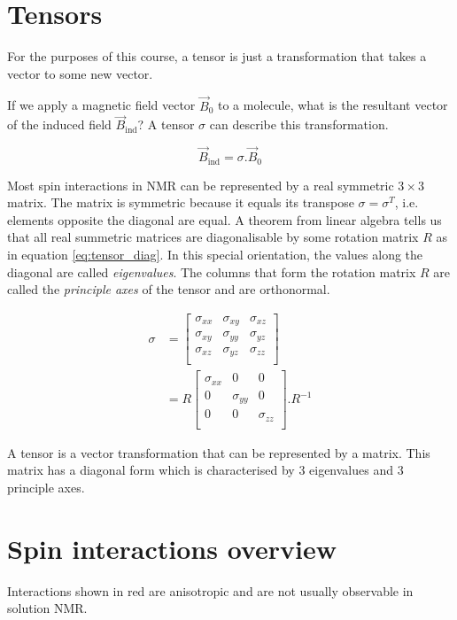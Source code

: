\documentclass[11pt]{article}
\theoremstyle{definition}
\begin{document}
\section{Tensors}
For the purposes of this course, a tensor is just a transformation that takes a vector to some new vector. 

If we apply a magnetic field vector $\vec B_0$ to a molecule, what is the resultant vector of the induced field $\vec B_\text{ind}$? A tensor $\sigma$ can describe this transformation.

\begin{equation}
	\vec B_\text{ind} = \sigma . \vec B_0
\end{equation}

Most spin interactions in NMR can be represented by a real symmetric $3\times 3$ matrix. The matrix is symmetric because it equals its transpose $\sigma=\sigma^T$, i.e. elements opposite the diagonal are equal. A theorem from linear algebra tells us that all real summetric matrices are diagonalisable by some rotation matrix $R$ as in equation \ref{eq:tensor_diag}. In this special orientation, the values along the diagonal are called \emph{eigenvalues}. The columns that form the rotation matrix $R$ are called the \emph{principle axes} of the tensor and are orthonormal. 

\begin{align}
	\sigma&=
	\begin{bmatrix}
		\sigma_{xx} & \sigma_{xy} & \sigma_{xz}\\
		\sigma_{xy} & \sigma_{yy} & \sigma_{yz}\\
		\sigma_{xz} & \sigma_{yz} & \sigma_{zz}\\
	\end{bmatrix}\\
	\label{eq:tensor_diag}
	&=R
	\begin{bmatrix}
		\sigma_{xx} & 0 & 0\\
		0 & \sigma_{yy} & 0\\
		0 & 0 & \sigma_{zz}\\
	\end{bmatrix}.R^{-1}
\end{align}

\begin{shaded}
	A tensor is a vector transformation that can be represented by a matrix. This matrix has a diagonal form which is characterised by 3 eigenvalues and 3 principle axes.
\end{shaded}

\section{Spin interactions overview}
Interactions shown in red are anisotropic and are not usually observable in solution NMR.
\end{document}
